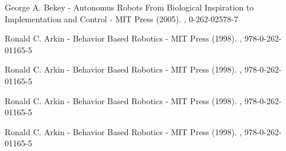 \documentclass[oneside,twocolumn]{article}
\begin{document}
\begin{thebibliography}{99} %
  
  George A. Bekey - Autonomus Robots From Biological Inspiration to Implementation and Control - MIT Press (2005).
  , 0-262-02578-7

  Ronald C. Arkin - Behavior Based Robotics - MIT Press (1998).
  , 978-0-262-01165-5

  Ronald C. Arkin - Behavior Based Robotics - MIT Press (1998).
  , 978-0-262-01165-5


  Ronald C. Arkin - Behavior Based Robotics - MIT Press (1998).
  , 978-0-262-01165-5

  Ronald C. Arkin - Behavior Based Robotics - MIT Press (1998).
  , 978-0-262-01165-5
  
\end{thebibliography}

\end{document}
